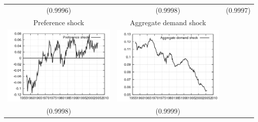 \documentclass{beamer}
\begin{document}
{\begin{center}
\begin{tabular}{ccc}
  (0.9996) & (0.9998) & (0.9997) \\ 
  \small{Preference shock} & \small{Aggregate demand shock} & \\
  \includegraphics[scale=0.23]{plots2/cap_diff_prefsh.png} & \includegraphics[scale=0.23]{plots2/cap_diff_ADsh.png} & \\
  (0.9998) & (0.9999) &  \\ 

  \end{tabular}
  \end{center}
}
\end{document}
